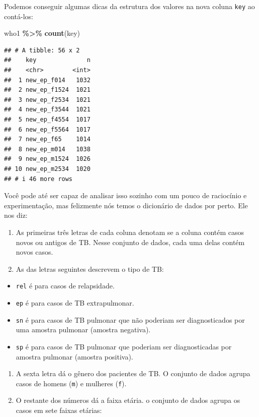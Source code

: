\documentclass[
]{latex/krantz}
\newenvironment{Shaded}{\begin{snugshade}}{\end{snugshade}}
\newcommand{\FunctionTok}[1]{\textcolor[rgb]{0.13,0.29,0.53}{\textbf{#1}}}
\newcommand{\NormalTok}[1]{#1}
\newcommand{\SpecialCharTok}[1]{\textcolor[rgb]{0.81,0.36,0.00}{\textbf{#1}}}
\providecommand{\tightlist}{%
  \setlength{\itemsep}{0pt}\setlength{\parskip}{0pt}}
\theoremstyle{definition}
\theoremstyle{definition}
\theoremstyle{definition}
\theoremstyle{definition}
\theoremstyle{remark}
\begin{document}
Podemos conseguir algumas dicas da estrutura dos valores na nova coluna \texttt{key} ao contá-los:

\begin{Shaded}
\begin{Highlighting}[]
\NormalTok{who1 }\SpecialCharTok{\%\textgreater{}\%}
  \FunctionTok{count}\NormalTok{(key)}
\end{Highlighting}
\end{Shaded}

\begin{verbatim}
## # A tibble: 56 x 2
##    key              n
##    <chr>        <int>
##  1 new_ep_f014   1032
##  2 new_ep_f1524  1021
##  3 new_ep_f2534  1021
##  4 new_ep_f3544  1021
##  5 new_ep_f4554  1017
##  6 new_ep_f5564  1017
##  7 new_ep_f65    1014
##  8 new_ep_m014   1038
##  9 new_ep_m1524  1026
## 10 new_ep_m2534  1020
## # i 46 more rows
\end{verbatim}

Você pode até ser capaz de analisar isso sozinho com um pouco de raciocínio e experimentação, mas felizmente nós temos o dicionário de dados por perto. Ele nos diz:

\begin{enumerate}
\def\labelenumi{\arabic{enumi}.}
\tightlist
\item
  As primeiras três letras de cada coluna denotam se a coluna contém casos novos ou antigos de TB. Nesse conjunto de dados, cada uma delas contém novos casos.
\item
  As das letras seguintes descrevem o tipo de TB:
\end{enumerate}

\begin{itemize}
\tightlist
\item
  \texttt{rel} é para casos de relapsidade.
\item
  \texttt{ep} é para casos de TB extrapulmonar.
\item
  \texttt{sn} é para casos de TB pulmonar que não poderiam ser diagnosticados por uma amostra pulmonar (amostra negativa).
\item
  \texttt{sp} é para casos de TB pulmonar que poderiam ser diagnosticadas por amostra pulmonar (amostra positiva).
\end{itemize}

\begin{enumerate}
\def\labelenumi{\arabic{enumi}.}
\setcounter{enumi}{2}
\tightlist
\item
  A sexta letra dá o gênero dos pacientes de TB. O conjunto de dados agrupa casos de homens (\texttt{m}) e mulheres (\texttt{f}).
\item
  O restante dos números dá a faixa etária. o conjunto de dados agrupa os casos em sete faixas etárias:
\end{enumerate}
\end{document}
